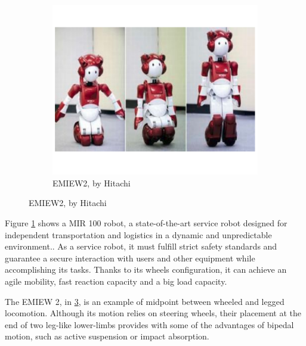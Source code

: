 \begin{figure}[h]
\begin{subfigure}[b]{0.32\textwidth}
        \label{fig:mobile_mir}
    \end{subfigure}
    \centering
    \begin{subfigure}[b]{0.32\textwidth}
        \includegraphics[width=\textwidth]{figures/mobile_hitachi.pdf}
        \caption{EMIEW2, by Hitachi}
        \label{fig:mobile_hitachi}
    \end{subfigure}
\end{figure}

Figure \ref{fig:mobile_mir} shows a MIR 100 robot, a state-of-the-art service robot designed for independent transportation and logistics in a dynamic and unpredictable environment..
As a service robot, it must fulfill strict safety standards and guarantee a secure interaction with users and other equipment while accomplishing its tasks.
Thanks to its wheels configuration, it can achieve an agile mobility, fast reaction capacity and a big load capacity.

The EMIEW 2, in \ref{fig:mobile_hitachi}, is an example of midpoint between wheeled and legged locomotion.
Although its motion relies on steering wheels, their placement at the end of two leg-like lower-limbs provides with some of the advantages of bipedal motion, such as active suspension or impact absorption.



